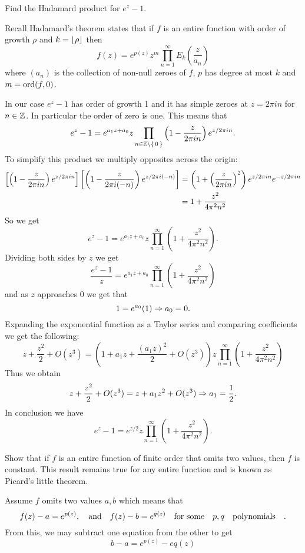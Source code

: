 \documentclass[12pt]{memoir}
\begin{document}
\begin{Ej}
   Find the Hadamard product for $e^z-1$.
\end{Ej}

\begin{ptcbr}
Recall Hadamard's theorem states that if $f$ is an entire function with order of growth $\rho$ and $k=\lfloor\rho\rfloor$ then 
$$f(z)=e^{p(z)}z^m\prod_{n=1}^{\infty}E_k\left(\frac{z}{a_n}\right)$$
where $(a_n)$ is the collection of non-null zeroes of $f$, $p$ has degree at most $k$ and $m=\operatorname{ord}(f,0)$.\par 
In our case $e^z-1$ has order of growth 1 and it has simple zeroes at $z=2\pi i n$ for $n\in\mathbb{Z}$. In particular the order of zero is one. This means that 
$$e^z-1=e^{a_1z+a_0}z\prod_{n\in\mathbb{Z}\setminus\{\,0\,\}}\left(1-\frac{z}{2\pi i n}\right)e^{z/2\pi i n}.$$
To simplify this product we multiply opposites across the origin:
\begin{align*}
\left\lbrack\left(1-\frac{z}{2\pi i n}\right)e^{z/2\pi i n}\right\rbrack\left\lbrack\left(1-\frac{z}{2\pi i (-n)}\right)e^{z/2\pi i (-n)}\right\rbrack&=\left(1+\left(\frac{z}{2\pi i n}\right)^2\right)e^{z/2\pi i n}e^{-z/2\pi i n}\\
&=1+\frac{z^2}{4\pi^2n^2}   
\end{align*}
So we get
$$e^z-1=e^{a_1z+a_0}z\prod_{n=1}^\infty\left(1+\frac{z^2}{4\pi^2n^2} \right).$$ 
Dividing both sides by $z$ we get 
$$\frac{e^z-1}{z}=e^{a_1z+a_0}\prod_{n=1}^\infty\left(1+\frac{z^2}{4\pi^2n^2} \right)$$
and as $z$ approaches $0$ we get that 
$$1=e^{a_0}(1)\Rightarrow a_0=0.$$
Expanding the exponential function as a Taylor series and comparing coefficients we get the following:
$$z+\frac{z^2}{2}+O(z^3)=(1+a_1z+\frac{(a_1z)^2}{2}+O(z^3))z\prod_{n=1}^\infty\left(1+\frac{z^2}{4\pi^2n^2} \right)$$
Thus we obtain 
$$z+\frac{z^2}{2}+O(z^3)=z+a_1z^2+O(z^3)\Rightarrow a_1=\frac{1}{2}.$$
In conclusion we have 
$$e^z-1=e^{z/2}z\prod_{n=1}^\infty\left(1+\frac{z^2}{4\pi^2n^2} \right).$$
\end{ptcbr}

\begin{Ej}
   Show that if $f$ is an entire function of finite order that omits two values, then $f$ is constant. This result remains true for any entire function and is known as Picard's little theorem.

\end{Ej}

\begin{ptcbr}
Assume $f$ omits two values $a,b$ which means that 
$$f(z)-a=e^{p(z)},\quad\text{and}\quad f(z)-b=e^{q(z)}\quad\text{for some}\quad p,q\quad\text{polynomials}\quad.$$
From this, we may subtract one equation from the other to get 
$$b-a=e^{p(z)}-e{q(z)}$$
   \end{ptcbr}
\end{document}
